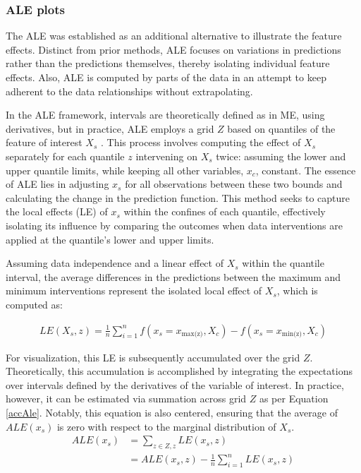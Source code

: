 \subsubsection{ALE plots}

The ALE was established as an additional alternative to illustrate the feature effects. Distinct from prior methods, ALE focuses on variations in predictions rather than the predictions themselves, thereby isolating individual feature effects. Also, ALE is computed by parts of the data in an attempt to keep adherent to the data relationships without extrapolating. 

In the ALE framework, intervals are theoretically defined as in ME, using derivatives, but in practice, ALE employs a grid \(Z\) based on quantiles of the feature of interest $X_s$ .  This process involves computing the effect of $X_s$ separately for each quantile $z$ intervening on $X_s$ twice: assuming the lower and upper quantile limits, while keeping all other variables, $x_c$, constant. The essence of ALE lies in adjusting $x_s$ for all observations between these two bounds and calculating the change in the prediction function. This method seeks to capture the local effects (LE) of $x_s$ within the confines of each quantile, effectively isolating its influence by comparing the outcomes when data interventions are applied at the quantile's lower and upper limits.

Assuming data independence and a linear effect of $X_s$ within the quantile interval, the average differences in the predictions between the maximum and minimum interventions represent the isolated local effect of $X_s$, which is computed as:

\begin{equation}
\begin{aligned}
LE({X_s, z}) = \frac{1}{n}\sum_{i=1}^{n} f(x_s = x_{\text{max(z)}}, X_c) - f(x_s = x_{\text{min(z)}}, X_c)
\end{aligned}
\label{accAle}
\end{equation}


For visualization, this LE is subsequently accumulated over the grid $Z$. Theoretically, this accumulation is accomplished by integrating the expectations over intervals defined by the derivatives of the variable of interest. In practice, however, it can be estimated via summation across grid $Z$ as per Equation \ref{accAle}. Notably, this equation is also centered, ensuring that the average of $ALE(x_s)$ is zero with respect to the marginal distribution of $X_s$. 
\begin{equation}
\begin{aligned}
ALE(x_s) &= \sum_{{z \in Z, z}} LE(x_s, z) \\
&= ALE(x_s,z) - \frac{1}{n}\sum_{i=1}^{n} LE(x_s,z)
\end{aligned}
\label{centerAle}
\end{equation}

